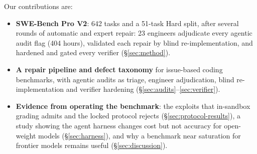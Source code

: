 Our contributions are:
\begin{itemize}\setlength\itemsep{0pt}
\item \textbf{SWE-Bench Pro V2}: 642 tasks and a 51-task Hard split, after several rounds of automatic and expert repair: 23 engineers adjudicate every agentic audit flag (404 hours), validated each repair by blind re-implementation, and hardened and gated every verifier (\S\ref{sec:method}).

\item \textbf{A repair pipeline and defect taxonomy} for issue-based coding benchmarks, with agentic audits as triage, engineer adjudication, blind re-implementation and verifier hardening (\S\ref{sec:audits}--\ref{sec:verifier}).

\item \textbf{Evidence from operating the benchmark}: the exploits that in-sandbox grading admits and the locked protocol rejects (\S\ref{sec:protocol-results}), a study showing the agent harness changes cost but not accuracy for open-weight models (\S\ref{sec:harness}), and why a benchmark near saturation for frontier models remains useful (\S\ref{sec:discussion}).

\end{itemize}


